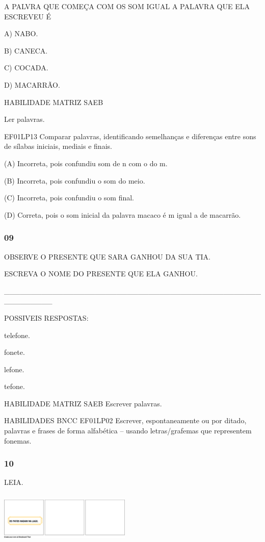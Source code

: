 A PALVRA QUE COMEÇA COM OS SOM IGUAL A PALAVRA QUE ELA ESCREVEU É

A) NABO.

B) CANECA.

C) COCADA.

D) MACARRÃO.

HABILIDADE MATRIZ SAEB

Ler palavras.

EF01LP13 Comparar palavras, identificando semelhanças e diferenças entre
sons de sílabas iniciais, mediais e finais.

(A) Incorreta, pois confundiu som de n com o do m.

(B) Incorreta, pois confundiu o som do meio.

(C) Incorreta, pois confundiu o som final.

(D) Correta, pois o som inicial da palavra macaco é m igual a de
macarrão.\protect\hypertarget{_heading=h.z3c8l2ojus6u}{}{}

\subsubsection{09}\label{section-81}

OBSERVE O PRESENTE QUE SARA GANHOU DA SUA TIA.

ESCREVA O NOME DO PRESENTE QUE ELA GANHOU.

\_\_\_\_\_\_\_\_\_\_\_\_\_\_\_\_\_\_\_\_\_\_\_\_\_\_\_\_\_\_\_\_\_\_\_\_\_\_\_\_\_\_\_\_\_\_\_\_\_\_\_\_\_\_\_\_\_

POSSIVEIS RESPOSTAS:

telefone.

fonete.

lefone.

tefone.

HABILIDADE MATRIZ SAEB Escrever palavras.

HABILIDADES BNCC EF01LP02 Escrever, espontaneamente ou por ditado,
palavras e frases de forma alfabética -- usando letras/grafemas que
representem fonemas.

\subsubsection{10}\label{section-82}

LEIA.

\includegraphics[width=2.46358in,height=0.98459in]{media/image249.png}

